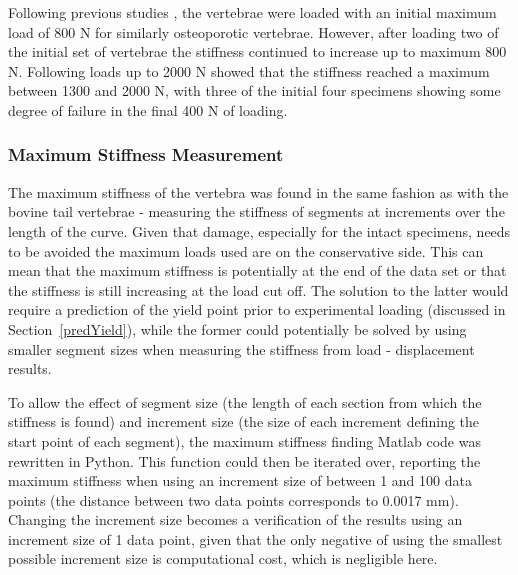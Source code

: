 Following previous studies \cite{Wijayathunga2008}, the vertebrae were loaded
with an initial maximum load of 800 N for similarly osteoporotic vertebrae.
However, after loading two of the initial set of vertebrae the stiffness
continued to increase up to maximum 800 N. Following loads up to 2000 N showed
that the stiffness reached a maximum between 1300 and 2000 N, with three of the
initial four specimens showing some degree of failure in the final 400 N of
loading.

\subsubsection{Maximum Stiffness Measurement}

The maximum stiffness of the vertebra was found in the same fashion as with the
bovine tail vertebrae - measuring the stiffness of segments at increments over
the length of the curve. Given that damage, especially for the intact specimens,
needs to be avoided the maximum loads used are on the conservative side. This
can mean that the maximum stiffness is potentially at the end of the data set or
that the stiffness is still increasing at the load cut off. The solution to the
latter would require a prediction of the yield point prior to experimental
loading (discussed in Section~\ref{predYield}), while the former could
potentially be solved by using smaller segment sizes when measuring the
stiffness from load - displacement results.

To allow the effect of segment size (the length of each section from which the
stiffness is found) and increment size (the size of each increment defining the
start point of each segment), the maximum stiffness finding Matlab code was
rewritten in Python. This function could then be iterated over, reporting the
maximum stiffness when using an increment size of between 1 and 100 data points
(the distance between two data points corresponds to 0.0017 mm). Changing the
increment size becomes a verification of the results using an increment size of
1 data point, given that the only negative of using the smallest possible
increment size is computational cost, which is negligible here.

